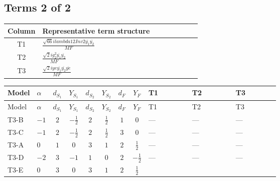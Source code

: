 \documentclass[8pt]{article}
\begin{document}
\begin{landscape}
\subsection*{Terms 2 of 2}
\begin{center}
\begin{tabular}{@{}c >{\raggedright\arraybackslash}p{0.82\linewidth}@{}}
\toprule
Column & Representative term structure \\
\midrule
T1 & \(\displaystyle \frac{\sqrt{66} i lambda12Inv2 \overline{y_{1}} \overline{y_{2}}}{MF}\) \\
\midrule
T2 & \(\displaystyle \frac{\sqrt{2} i g_{2}^{2} \overline{y_{1}} \overline{y_{2}}}{MF}\) \\
\midrule
T3 & \(\displaystyle \frac{\sqrt{2} i ye \overline{y_{1}} \overline{y_{2}} \overline{ye}}{MF}\) \\
\midrule
\bottomrule
\end{tabular}
\end{center}
\smallskip
\tiny
\begin{longtable}{@{}llcccccc >{\raggedright\arraybackslash}p{0.21\linewidth} >{\raggedright\arraybackslash}p{0.21\linewidth} >{\raggedright\arraybackslash}p{0.21\linewidth}@{}}
\toprule
Model & $\alpha$ & $d_{S_1}$ & $Y_{S_1}$ & $d_{S_2}$ & $Y_{S_2}$ & $d_F$ & $Y_F$ & T1 & T2 & T3 \\
\midrule
\endfirsthead
\toprule
Model & $\alpha$ & $d_{S_1}$ & $Y_{S_1}$ & $d_{S_2}$ & $Y_{S_2}$ & $d_F$ & $Y_F$ & T1 & T2 & T3 \\
\midrule
\endhead
T3-B & $-1$ & $2$ & $-\frac{1}{2}$ & $2$ & $\frac{1}{2}$ & $1$ & $0$ & --- & --- & --- \\
\midrule
T3-C & $-1$ & $2$ & $-\frac{1}{2}$ & $2$ & $\frac{1}{2}$ & $3$ & $0$ & --- & --- & --- \\
\midrule
T3-A & $0$ & $1$ & $0$ & $3$ & $1$ & $2$ & $\frac{1}{2}$ & --- & --- & --- \\
\midrule
T3-D & $-2$ & $3$ & $-1$ & $1$ & $0$ & $2$ & $-\frac{1}{2}$ & --- & --- & --- \\
\midrule
T3-E & $0$ & $3$ & $0$ & $3$ & $1$ & $2$ & $\frac{1}{2}$ & \scriptsize\adjustbox{max width=\linewidth}{$\begin{gathered} \frac{3 \sqrt{66} i lambda12Inv2 \overline{y_{1}} \overline{y_{2}}}{44 MF}\end{gathered}$} & \scriptsize\adjustbox{max width=\linewidth}{$\begin{gathered} \frac{33 \sqrt{2} i g_{2}^{2} \overline{y_{1}} \overline{y_{2}}}{16 MF}\end{gathered}$} & \scriptsize\adjustbox{max width=\linewidth}{$\begin{gathered} - \frac{\sqrt{2} i ye \overline{y_{1}} \overline{y_{2}} \overline{ye}}{8 MF}\end{gathered}$} \\
\midrule
\bottomrule
\end{longtable}
\clearpage

\end{landscape}
\end{document}
